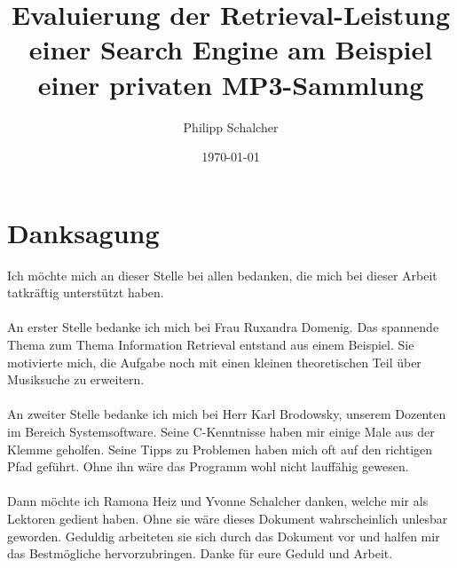 \documentclass[12pt,a4paper,ngerman]{report}
\author{Philipp Schalcher}
\title{Evaluierung der Retrieval-Leistung einer Search Engine am Beispiel einer privaten MP3-Sammlung}
\date{\today}
\begin{document}

\chapter*{Danksagung}
Ich möchte mich an dieser Stelle bei allen bedanken, die mich bei dieser Arbeit tatkräftig unterstützt haben.\\
\\
An erster Stelle bedanke ich mich bei Frau Ruxandra Domenig. Das spannende Thema zum Thema Information Retrieval entstand aus einem Beispiel. Sie motivierte mich, die Aufgabe noch mit einen kleinen theoretischen Teil über Musiksuche zu erweitern.\\
\\
An zweiter Stelle bedanke ich mich bei Herr Karl Brodowsky, unserem Dozenten im Bereich Systemsoftware. Seine C-Kenntnisse haben mir einige Male aus der Klemme geholfen. Seine Tipps zu Problemen haben mich oft auf den richtigen Pfad geführt. Ohne ihn wäre das Programm wohl nicht lauffähig gewesen.\\
\\
Dann möchte ich Ramona Heiz und Yvonne Schalcher danken, welche mir als Lektoren gedient haben. Ohne sie wäre dieses Dokument wahrscheinlich unlesbar geworden. Geduldig arbeiteten sie sich durch das Dokument vor und halfen mir das Bestmögliche hervorzubringen. Danke für eure Geduld und Arbeit.
\tableofcontents
\end{document}
